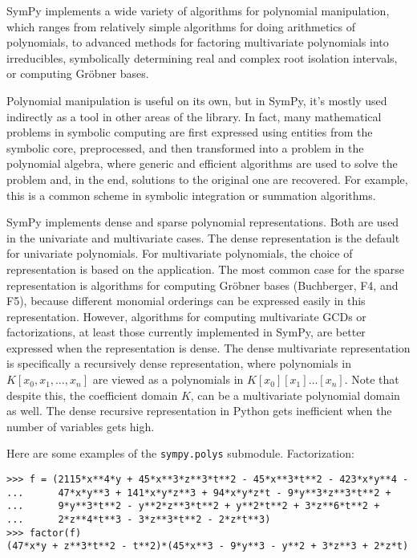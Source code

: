 
SymPy implements a wide variety of algorithms for polynomial manipulation,
which ranges from relatively simple algorithms for doing arithmetics of
polynomials, to advanced methods for factoring multivariate polynomials
into irreducibles, symbolically determining real and complex root isolation
intervals, or computing Gröbner bases.

Polynomial manipulation is useful on its own, but in SymPy, it's mostly used
indirectly as a tool in other areas of the library. In fact, many mathematical
problems in symbolic computing are first expressed using entities from the
symbolic core, preprocessed, and then transformed into a problem in the
polynomial algebra, where generic and efficient algorithms are used to solve
the problem and, in the end, solutions to the original one are recovered. For
example, this is a common scheme in symbolic integration or summation
algorithms.

SymPy implements dense and sparse polynomial representations. Both are used in
the univariate and multivariate cases. The dense representation is the default
for univariate polynomials. For multivariate polynomials, the choice of
representation is based on the application. The most common case for the sparse
representation is algorithms for computing Gröbner bases (Buchberger, F4, and
F5),
because different monomial orderings can be expressed easily in this
representation. However, algorithms for computing multivariate GCDs or
factorizations, at least those currently implemented in SymPy,
are better expressed when the representation is dense. The dense multivariate
representation is specifically a recursively dense representation, where
polynomials in $K[x_0, x_1,\dots, x_n]$ are viewed as a polynomials in
$K[x_0][x_1]\ldots[x_n]$. Note that despite this, the coefficient domain $K$,
can be a multivariate polynomial domain as well. The dense recursive
representation in Python gets inefficient when the number of variables gets
high.

Here are some examples of the \texttt{sympy.polys} submodule.
\noindent Factorization:
\begin{verbatim}
>>> f = (2115*x**4*y + 45*x**3*z**3*t**2 - 45*x**3*t**2 - 423*x*y**4 -
...      47*x*y**3 + 141*x*y*z**3 + 94*x*y*z*t - 9*y**3*z**3*t**2 +
...      9*y**3*t**2 - y**2*z**3*t**2 + y**2*t**2 + 3*z**6*t**2 +
...      2*z**4*t**3 - 3*z**3*t**2 - 2*z*t**3)
>>> factor(f)
(47*x*y + z**3*t**2 - t**2)*(45*x**3 - 9*y**3 - y**2 + 3*z**3 + 2*z*t)
\end{verbatim}

